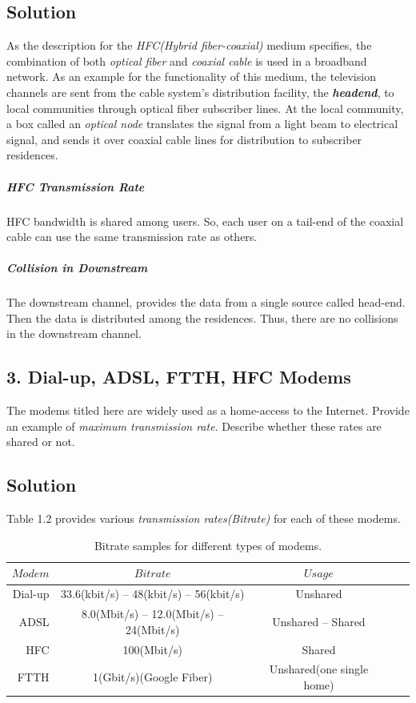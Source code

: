 \documentclass[12pt]{article}
\numberwithin{equation}{section}
\numberwithin{table}{section}
\numberwithin{figure}{section}
\begin{document}
\subsection{Solution}

As the description for the \textit{HFC(Hybrid fiber-coaxial)} medium specifies, the combination of both \textit{optical fiber} and \textit{coaxial cable} is used in a broadband network. As an example for the functionality of this medium, the television channels are sent from the cable system's distribution facility, the \textit{\textbf{headend}}, to local communities through optical fiber subscriber lines. At the local community, a box called an \textit{optical node} translates the signal from a light beam to electrical signal, and sends it over coaxial cable lines for distribution to subscriber residences.\\
\subparagraph{HFC Transmission Rate }HFC bandwidth is shared among users. So, each user on a tail-end of the coaxial cable can use the same transmission rate as others.\\
\subparagraph{Collision in Downstream}

The downstream channel, provides the data from a single source called head-end. Then the data is distributed among the residences. Thus, there are no collisions in the downstream channel.
\\


\subsection{3. Dial-up, ADSL, FTTH, HFC Modems}
The modems titled here are widely used as a home-access to the Internet. Provide an example of \textit{maximum transmission rate}. Describe whether these rates are shared or not.

\subsection{Solution}

Table 1.2 provides various \textit{transmission rates(Bitrate)} for each of these modems.

\begin{table}[!h]
	\centering
	\begin{tabular}{rcccc}
		\hline
		$ Modem $ &
		$ Bitrate $ & $ Usage $ \\
		\hline
		Dial-up & 33.6(kbit/s) -- 48(kbit/s) -- 56(kbit/s) & Unshared \\
		ADSL & 8.0(Mbit/s) -- 12.0(Mbit/s) -- 24(Mbit/s) & Unshared -- Shared\\
		HFC &  100(Mbit/s) & Shared\\
		FTTH & 1(Gbit/s)(Google Fiber) & Unshared(one single home)\\
		\hline
	\end{tabular}
	\caption{Bitrate samples for different types of modems.}
	\label{tabconvdemo}
\end{table}
\end{document}
